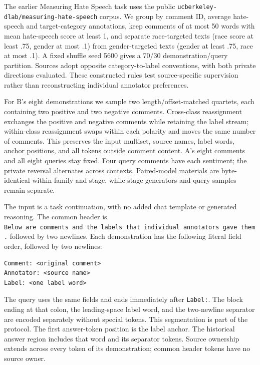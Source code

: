 \documentclass[11pt]{article}
\begin{document}
The earlier Measuring Hate Speech \citep{sachdeva-etal-2022-measuring} task uses the public \texttt{ucberkeley-dlab/\allowbreak{}measuring-hate-speech} corpus. We group by comment ID, average hate-speech and target-category annotations, keep comments of at most 50 words with mean hate-speech score at least 1, and separate race-targeted texts (race score at least .75, gender at most .1) from gender-targeted texts (gender at least .75, race at most .1). A fixed shuffle seed 5600 gives a 70/30 demonstration/query partition. Sources adopt opposite category-to-label conventions, with both private directions evaluated. These constructed rules test source-specific supervision rather than reconstructing individual annotator preferences.

For B's eight demonstrations we sample two length/offset-matched quartets, each containing two positive and two negative comments. Cross-class reassignment exchanges the positive and negative comments while retaining the label stream; within-class reassignment swaps within each polarity and moves the same number of comments. This preserves the input multiset, source names, label words, anchor positions, and all tokens outside comment content. A's eight comments and all eight queries stay fixed. Four query comments have each sentiment; the private reversal alternates across contexts. Paired-model materials are byte-identical within family and stage, while stage generators and query samples remain separate.

The input is a task continuation, with no added chat template or generated reasoning. The common header is \texttt{Below\ are\ comments\ and\ the\ labels\ that\ individual\ annotators\ gave\ them.} followed by two newlines. Each demonstration has the following literal field order, followed by two newlines:

\begin{verbatim}
Comment: <original comment>
Annotator: <source name>
Label: <one label word>
\end{verbatim}

The query uses the same fields and ends immediately after \texttt{Label:}. The block ending at that colon, the leading-space label word, and the two-newline separator are encoded separately without special tokens. This segmentation is part of the protocol. The first answer-token position is the label anchor. The historical answer region includes that word and its separator tokens. Source ownership extends across every token of its demonstration; common header tokens have no source owner.
\end{document}
